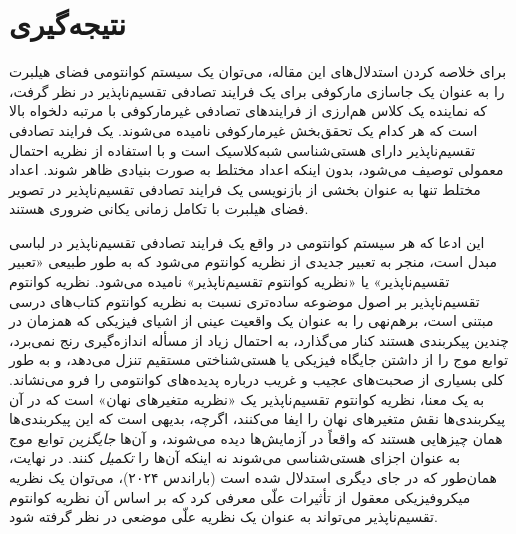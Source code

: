 \documentclass{article}
\begin{document}
\section{نتیجه‌گیری\label{sec:Conclusion}}

برای خلاصه کردن استدلال‌های این مقاله، می‌توان یک سیستم کوانتومی فضای هیلبرت را به عنوان یک جاسازی مارکوفی برای یک فرایند تصادفی تقسیم‌ناپذیر در نظر گرفت، که نماینده یک کلاس هم‌ارزی از فرایندهای تصادفی غیرمارکوفی با مرتبه دلخواه بالا است که هر کدام یک تحقق‌بخش غیرمارکوفی نامیده می‌شوند. یک فرایند تصادفی تقسیم‌ناپذیر دارای هستی‌شناسی شبه‌کلاسیک است و با استفاده از نظریه احتمال معمولی توصیف می‌شود، بدون اینکه اعداد مختلط به صورت بنیادی ظاهر شوند. اعداد مختلط تنها به عنوان بخشی از بازنویسی یک فرایند تصادفی تقسیم‌ناپذیر در تصویر فضای هیلبرت با تکامل زمانی یکانی ضروری هستند.

این ادعا که هر سیستم کوانتومی در واقع یک فرایند تصادفی تقسیم‌ناپذیر در لباسی مبدل است، منجر به تعبیر جدیدی از نظریه کوانتوم می‌شود که به طور طبیعی «تعبیر تقسیم‌ناپذیر» یا «نظریه کوانتوم تقسیم‌ناپذیر» نامیده می‌شود. نظریه کوانتوم تقسیم‌ناپذیر بر اصول موضوعه ساده‌تری نسبت به نظریه کوانتوم کتاب‌های درسی مبتنی است، برهم‌نهی را به عنوان یک واقعیت عینی از اشیای فیزیکی که همزمان در چندین پیکربندی هستند کنار می‌گذارد، به احتمال زیاد از مسأله اندازه‌گیری رنج نمی‌برد، توابع موج را از داشتن جایگاه فیزیکی یا هستی‌شناختی مستقیم تنزل می‌دهد، و به طور کلی بسیاری از صحبت‌های عجیب و غریب درباره پدیده‌های کوانتومی را فرو می‌نشاند. به یک معنا، نظریه کوانتوم تقسیم‌ناپذیر یک «نظریه متغیرهای نهان» است که در آن پیکربندی‌ها نقش متغیرهای نهان را ایفا می‌کنند، اگرچه، بدیهی است که این پیکربندی‌ها همان چیزهایی هستند که واقعاً در آزمایش‌ها دیده می‌شوند، و آن‌ها \emph{جایگزین} توابع موج به عنوان اجزای هستی‌شناسی می‌شوند نه اینکه آن‌ها را \emph{تکمیل} کنند. در نهایت، همان‌طور که در جای دیگری استدلال شده است (باراندس ۲۰۲۴)\nocite{Barandes:2024npfaclfoqt}، می‌توان یک نظریه میکروفیزیکی معقول از تأثیرات علّی معرفی کرد که بر اساس آن نظریه کوانتوم تقسیم‌ناپذیر می‌تواند به عنوان یک نظریه علّی موضعی در نظر گرفته شود.

\nocite{*}

\end{document}
